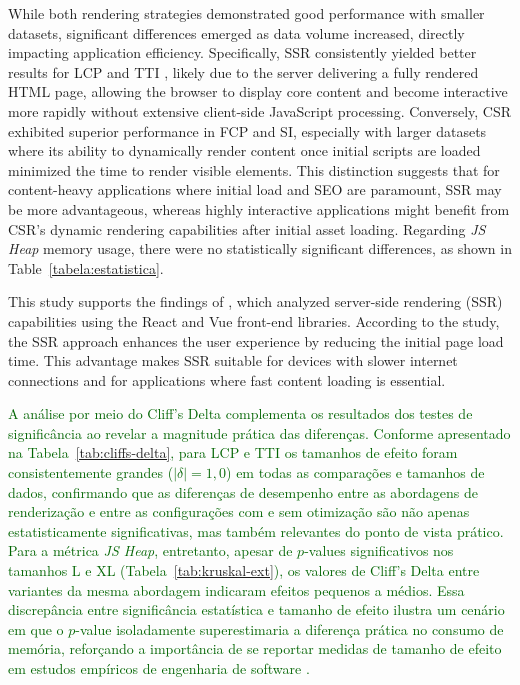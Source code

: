 \documentclass{sbc2019}%
\begin{document}
While both rendering strategies demonstrated good performance with smaller datasets, significant differences emerged as data volume increased, directly impacting application efficiency. Specifically, SSR consistently yielded better results for LCP and TTI , likely due to the server delivering a fully rendered HTML page, allowing the browser to display core content and become interactive more rapidly without extensive client-side JavaScript processing. Conversely, CSR exhibited superior performance in FCP and SI, especially with larger datasets where its ability to dynamically render content once initial scripts are loaded minimized the time to render visible elements. This distinction suggests that for content-heavy applications where initial load and SEO are paramount, SSR may be more advantageous, whereas highly interactive applications might benefit from CSR's dynamic rendering capabilities after initial asset loading. Regarding \textit{JS Heap} memory usage, there were no statistically significant differences, as shown in Table~\ref{tabela:estatistica}.

This study supports the findings of \citet{meredova2023ssr}, which analyzed server-side rendering (SSR) capabilities using the React and Vue front-end libraries. According to the study, the SSR approach enhances the user experience by reducing the initial page load time. This advantage makes SSR suitable for devices with slower internet connections and for applications where fast content loading is essential.

\textcolor{darkgreen}{A análise por meio do Cliff's Delta complementa os resultados dos testes de significância ao revelar a magnitude prática das diferenças. Conforme apresentado na Tabela~\ref{tab:cliffs-delta}, para LCP e TTI os tamanhos de efeito foram consistentemente grandes ($|\delta| = 1{,}0$) em todas as comparações e tamanhos de dados, confirmando que as diferenças de desempenho entre as abordagens de renderização e entre as configurações com e sem otimização são não apenas estatisticamente significativas, mas também relevantes do ponto de vista prático. Para a métrica \textit{JS Heap}, entretanto, apesar de $p$-values significativos nos tamanhos L e XL (Tabela~\ref{tab:kruskal-ext}), os valores de Cliff's Delta entre variantes da mesma abordagem indicaram efeitos pequenos a médios. Essa discrepância entre significância estatística e tamanho de efeito ilustra um cenário em que o $p$-value isoladamente superestimaria a diferença prática no consumo de memória, reforçando a importância de se reportar medidas de tamanho de efeito em estudos empíricos de engenharia de software \cite{Kitchenham2024, Kitchenham2017}.}
\end{document}
